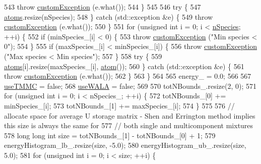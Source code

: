 \begin{DoxyCode}
543         \textcolor{keywordflow}{throw} \hyperlink{classcustom_exception}{customException} (e.what());
544     \}
545 
546     \textcolor{keywordflow}{try} \{
547         \hyperlink{classsim_system_a90421b19082f7fb8fc23b7264b1161e4}{atoms}.resize(nSpecies);
548     \} \textcolor{keywordflow}{catch} (std::exception &e) \{
549         \textcolor{keywordflow}{throw} \hyperlink{classcustom_exception}{customException} (e.what());
550     \}
551     \textcolor{keywordflow}{for} (\textcolor{keywordtype}{unsigned} \textcolor{keywordtype}{int} i = 0; i < \hyperlink{classsim_system_ab5e2e9b6204de15520302fe1d51688dd}{nSpecies}; ++i) \{
552         \textcolor{keywordflow}{if} (minSpecies\_[i] < 0) \{
553             \textcolor{keywordflow}{throw} \hyperlink{classcustom_exception}{customException} (\textcolor{stringliteral}{"Min species < 0"});
554         \}
555         \textcolor{keywordflow}{if} (maxSpecies\_[i] < minSpecies\_[i]) \{
556             \textcolor{keywordflow}{throw} \hyperlink{classcustom_exception}{customException} (\textcolor{stringliteral}{"Max species < Min species"});
557         \}
558         \textcolor{keywordflow}{try} \{
559             \hyperlink{classsim_system_a90421b19082f7fb8fc23b7264b1161e4}{atoms}[i].resize(maxSpecies\_[i], \hyperlink{classatom}{atom}());
560         \} \textcolor{keywordflow}{catch} (std::exception &e) \{
561             \textcolor{keywordflow}{throw} \hyperlink{classcustom_exception}{customException} (e.what());
562         \}
563     \}
564 
565     energy\_ = 0.0;
566 
567     \hyperlink{classsim_system_aa474a50b6353c8897331b1ab1ce53ab1}{useTMMC} = \textcolor{keyword}{false};
568     \hyperlink{classsim_system_aa83b00006b3919fb6e13f1bdeadece6a}{useWALA} = \textcolor{keyword}{false};
569 
570     totNBounds\_.resize(2, 0);
571     \textcolor{keywordflow}{for} (\textcolor{keywordtype}{unsigned} \textcolor{keywordtype}{int} i = 0; i < nSpecies\_; ++i) \{
572         totNBounds\_[0] += minSpecies\_[i];
573         totNBounds\_[1] += maxSpecies\_[i];
574     \}
575 
576     \textcolor{comment}{// allocate space for average U storage matrix - Shen and Errington method implies this size is always
       the same for}
577     \textcolor{comment}{// both single and multicomponent mixtures}
578     \textcolor{keywordtype}{long} \textcolor{keywordtype}{long} \textcolor{keywordtype}{int} size = totNBounds\_[1] - totNBounds\_[0] + 1;
579     energyHistogram\_lb\_.resize(size, -5.0);
580     energyHistogram\_ub\_.resize(size, 5.0);
581     \textcolor{keywordflow}{for} (\textcolor{keywordtype}{unsigned} \textcolor{keywordtype}{int} i = 0; i < size; ++i) \{

\end{DoxyCode}
